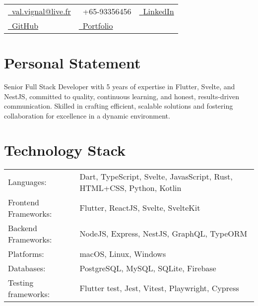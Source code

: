 \documentclass[a4paper,11pt]{article}
\makeatletter
\newcommand{\email}{val.vignal@live.fr}
\makeatother
\begin{document}

\par{\bigskip\par}


\begin{tabularx}{\textwidth}{X X X}
  \href{mailto:\email}{\raisebox{0.0\height}{\footnotesize \faEnvelope}\ {\email}}                   & {\raisebox{0.0\height}{\footnotesize \faPhone}\ +65-93356456}                                                  & \href{https://www.linkedin.com/feed/}{\raisebox{0.0\height}{\footnotesize \faLinkedin}\ {LinkedIn}} \\
  \href{https://github.com/ValentinVignal}{\raisebox{0.0\height}{\footnotesize \faGithub}\ {GitHub}} & \href{https://valentinvignal.github.io/portfolio/}{\raisebox{0.0\height}{\footnotesize \faGlobe}\ {Portfolio}}                                                                                                       \\
\end{tabularx}


\section{\textbf{Personal Statement}}
Senior Full Stack Developer with 5 years
of expertise in Flutter, Svelte, and NestJS, committed to quality, continuous
learning, and honest, results-driven communication. Skilled in crafting
efficient, scalable solutions and fostering collaboration for excellence in a
dynamic environment.


\section{\textbf{Technology Stack}}

\begin{tabular}{@{}l l}
  Languages:           & Dart, TypeScript, Svelte, JavasScript, Rust, HTML+CSS, Python, Kotlin \\
  Frontend Frameworks: & Flutter, ReactJS, Svelte, SvelteKit                                   \\
  Backend Frameworks:  & NodeJS, Express, NestJS, GraphQL, TypeORM                             \\
  Platforms:           & macOS, Linux, Windows                                                 \\
  Databases:           & PostgreSQL, MySQL, SQLite, Firebase                                   \\
  Testing frameworks:  & Flutter test, Jest, Vitest, Playwright, Cypress                       \\
\end{tabular}
\end{document}
